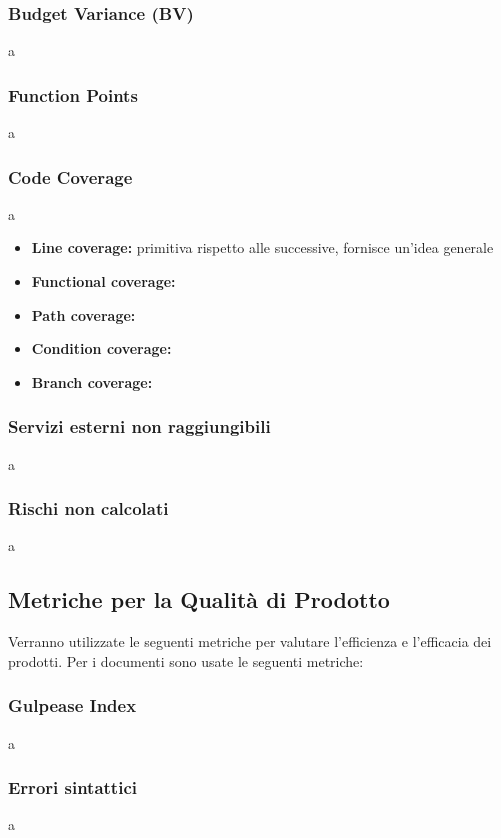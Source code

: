 	 	\subsubsection{Budget Variance (BV)} a\newline
	 	\subsubsection{Function Points} a\newline
	 	\subsubsection{Code Coverage} a\newline
	 		\begin{itemize}
	 			\item \textbf{Line coverage:} primitiva rispetto alle successive, fornisce un’idea generale
	 			\item \textbf{Functional coverage:}
	 			\item \textbf{Path coverage:}
	 			\item \textbf{Condition coverage:}
	 			\item \textbf{Branch coverage:}
	 		\end{itemize}
		 \subsubsection{Servizi esterni non raggiungibili} a\newline
		\subsubsection{Rischi non calcolati} a\newline
	\subsection{Metriche per la Qualità di Prodotto}
		Verranno  utilizzate  le  seguenti  metriche  per  valutare  l’efficienza  e  l’efficacia  dei prodotti. \newline Per i documenti sono usate le seguenti metriche:\newline
		\subsubsection{Gulpease Index} a\newline
		\subsubsection{Errori sintattici} a\newline
